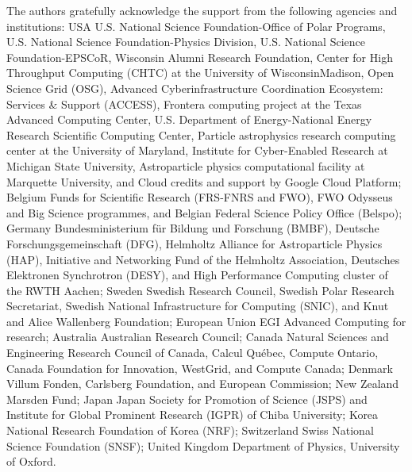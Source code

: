 \noindent
The authors gratefully acknowledge the support from the following agencies and institutions:
USA {\textendash} U.S. National Science Foundation-Office of Polar Programs,
U.S. National Science Foundation-Physics Division,
U.S. National Science Foundation-EPSCoR,
Wisconsin Alumni Research Foundation,
Center for High Throughput Computing (CHTC) at the University of Wisconsin{\textendash}Madison,
Open Science Grid (OSG),
Advanced Cyberinfrastructure Coordination Ecosystem: Services {\&} Support (ACCESS),
Frontera computing project at the Texas Advanced Computing Center,
U.S. Department of Energy-National Energy Research Scientific Computing Center,
Particle astrophysics research computing center at the University of Maryland,
Institute for Cyber-Enabled Research at Michigan State University,
Astroparticle physics computational facility at Marquette University,
and Cloud credits and support by Google Cloud Platform;
Belgium {\textendash} Funds for Scientific Research (FRS-FNRS and FWO),
FWO Odysseus and Big Science programmes,
and Belgian Federal Science Policy Office (Belspo);
Germany {\textendash} Bundesministerium f{\"u}r Bildung und Forschung (BMBF),
Deutsche Forschungsgemeinschaft (DFG),
Helmholtz Alliance for Astroparticle Physics (HAP),
Initiative and Networking Fund of the Helmholtz Association,
Deutsches Elektronen Synchrotron (DESY),
and High Performance Computing cluster of the RWTH Aachen;
Sweden {\textendash} Swedish Research Council,
Swedish Polar Research Secretariat,
Swedish National Infrastructure for Computing (SNIC),
and Knut and Alice Wallenberg Foundation;
European Union {\textendash} EGI Advanced Computing for research;
Australia {\textendash} Australian Research Council;
Canada {\textendash} Natural Sciences and Engineering Research Council of Canada,
Calcul Qu{\'e}bec, Compute Ontario, Canada Foundation for Innovation, WestGrid, and Compute Canada;
Denmark {\textendash} Villum Fonden, Carlsberg Foundation, and European Commission;
New Zealand {\textendash} Marsden Fund;
Japan {\textendash} Japan Society for Promotion of Science (JSPS)
and Institute for Global Prominent Research (IGPR) of Chiba University;
Korea {\textendash} National Research Foundation of Korea (NRF);
Switzerland {\textendash} Swiss National Science Foundation (SNSF);
United Kingdom {\textendash} Department of Physics, University of Oxford.